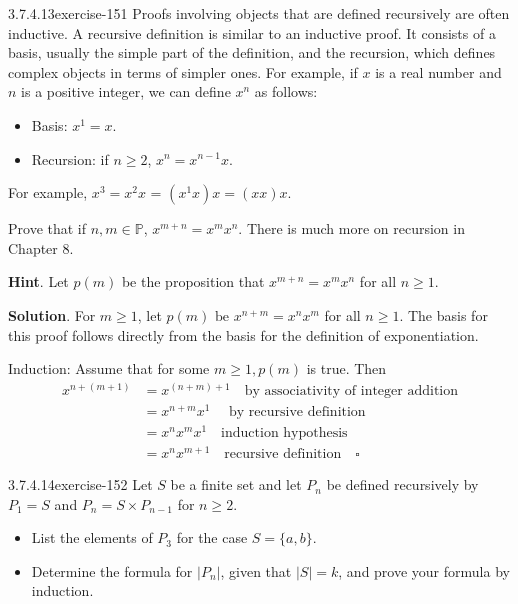 \documentclass[twoside,10pt,]{book}
\numberwithin{equation}{section}
\begin{document}
\begin{divisionsolution}{3.7.4.13}{}{exercise-151}%
\hypertarget{p-1372}{}%
Proofs involving objects that are defined recursively are often inductive.  A recursive definition is similar to an inductive proof. It consists of a basis, usually the simple part of the definition, and the recursion, which defines complex objects in terms of simpler ones. For example, if \(x\) is a real number and \(n\) is a positive integer, we can define \(x^n\) as follows:\leavevmode%
\begin{itemize}[label=\textbullet]
\item{}Basis: \(x^1=x\).%
\item{}Recursion: if \(n \geq  2\), \(x^n= x^{n-1}x\).%
\end{itemize}
For example, \(x^3= x^2x\) = \((x^1x)x = (x x) x\).%
\par
\hypertarget{p-1373}{}%
Prove that if \(n, m \in  \mathbb{P}\), \(x^{m+n}= x^mx^n\).  There is much more on recursion in Chapter 8.%
\par\smallskip%
\noindent\textbf{Hint}.\quad%
\hypertarget{p-1374}{}%
Let \(p(m)\) be the proposition that \(x^{m+n}= x^mx^n\) for all \(n\geq 1\).%
\par\smallskip%
\noindent\textbf{Solution}.\quad%
\hypertarget{p-1375}{}%
For \(m\geqslant 1\), let \(p(m)\textrm{ be } x^{n+m}=x^nx^m\) for all \(n\geqslant 1\). The basis for this proof follows directly from the basis for the definition of exponentiation.%
\par
\hypertarget{p-1376}{}%
Induction: Assume that for some \(m\geqslant 1, p(m)\) is true. Then%
\begin{equation*}
\begin{split}
x^{n+(m+1)} & =x^{(n+m)+1}\quad \textrm{by associativity of integer addition}\\
&=x^{n+m}x^1 \quad \textrm{  by recursive definition}\\
&=x^nx^mx^1 \quad \textrm{induction hypothesis}\\
&=x^nx^{m+1}\quad \textrm{recursive definition}\quad \square
\end{split}
\end{equation*}
%
\end{divisionsolution}%
\begin{divisionsolution}{3.7.4.14}{}{exercise-152}%
\hypertarget{p-1377}{}%
Let \(S\) be a finite set and let \(P_n\) be defined recursively by \(P_{1 } = S\)  and \(P_n= S\times P_{n-1}\) for \(n\geq 2\).\leavevmode%
\begin{itemize}[label=\textbullet]
\item{}List the elements of \(P_3\) for the case \(S = \{a, b\}\).%
\item{}Determine the formula for \(\lvert P_n \rvert\), given that \(\lvert S \rvert= k\), and prove your formula by induction.%
\end{itemize}
%
\end{divisionsolution}%
\end{document}
